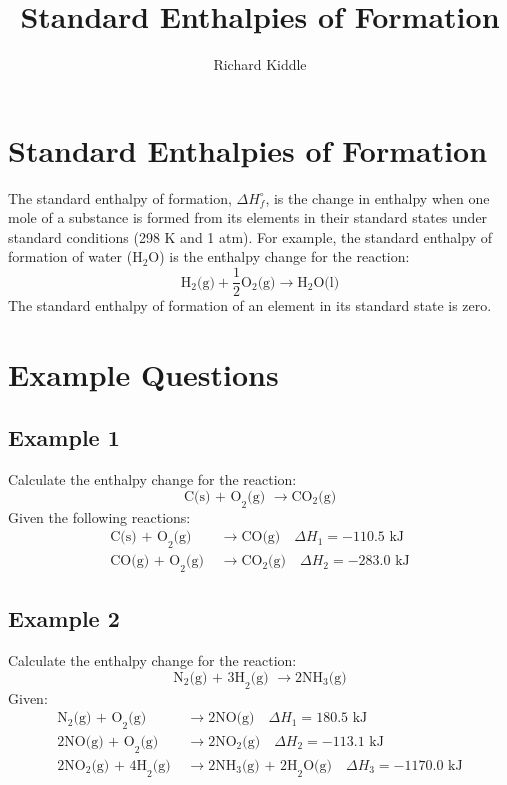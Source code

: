 \documentclass{article}
\title{Standard Enthalpies of Formation}
\author{Richard Kiddle}
\date{}
\begin{document}
\maketitle


\section*{Standard Enthalpies of Formation}
The standard enthalpy of formation, $\Delta H_f^\circ$, is the change in enthalpy when one mole of a substance is formed from its elements in their standard states under standard conditions (298 K and 1 atm). For example, the standard enthalpy of formation of water (H$_2$O) is the enthalpy change for the reaction:
\[
\text{H}_2\text{(g)} + \frac{1}{2}\text{O}_2\text{(g)} \rightarrow \text{H}_2\text{O(l)}
\]
The standard enthalpy of formation of an element in its standard state is zero.

\section*{Example Questions}
\subsection*{Example 1}
Calculate the enthalpy change for the reaction:
\[
\text{C(s) + O}_2\text{(g) } \rightarrow \text{CO}_2\text{(g)}
\]
Given the following reactions:
\begin{align*}
\text{C(s) + O}_2\text{(g) } &\rightarrow \text{CO(g)} \quad \Delta H_1 = -110.5 \text{ kJ} \\
\text{CO(g) + O}_2\text{(g) } &\rightarrow \text{CO}_2\text{(g)} \quad \Delta H_2 = -283.0 \text{ kJ}
\end{align*}

\subsection*{Example 2}
Calculate the enthalpy change for the reaction:
\[
\text{N}_2\text{(g) + 3H}_2\text{(g) } \rightarrow \text{2NH}_3\text{(g)}
\]
Given:
\begin{align*}
\text{N}_2\text{(g) + O}_2\text{(g) } &\rightarrow \text{2NO(g)} \quad \Delta H_1 = 180.5 \text{ kJ} \\
\text{2NO(g) + O}_2\text{(g) } &\rightarrow \text{2NO}_2\text{(g)} \quad \Delta H_2 = -113.1 \text{ kJ} \\
\text{2NO}_2\text{(g) + 4H}_2\text{(g) } &\rightarrow \text{2NH}_3\text{(g) + 2H}_2\text{O(g)} \quad \Delta H_3 = -1170.0 \text{ kJ}
\end{align*}
\end{document}
